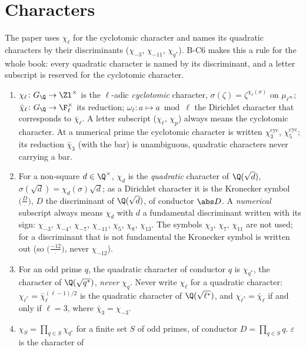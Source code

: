 \section{Characters}\label{sec:notation:characters}

The paper uses $\chi_\ell$ for the cyclotomic character and names its quadratic characters by their discriminants
($\chi_{-3}$, $\chi_{-11}$, $\chi_{q^*}$). B-C6 makes this a rule for the whole book: every quadratic character is named by its
discriminant, and a letter subscript is reserved for the cyclotomic character.

\begin{convention}[B-C6: characters]\label{conv:notation:bc6}
\leavevmode
\begin{enumerate}[label=(\alph*)]
\item $\chi_\ell\colon G_\Q\to\Zl^\times$ is the $\ell$-adic \emph{cyclotomic} character, $\sigma(\zeta)=\zeta^{\chi_\ell(\sigma)}$ on
$\mu_{\ell^\infty}$; $\bar\chi_\ell\colon G_\Q\to\F_\ell^\times$ its reduction; $\omega_\ell\colon a\mapsto a\bmod\ell$ the Dirichlet character that
corresponds to $\bar\chi_\ell$. A letter subscript ($\chi_\ell$, $\chi_p$) always means the cyclotomic character. At a numerical prime the
cyclotomic character is written $\chi_3^{\mathrm{cyc}}$, $\chi_5^{\mathrm{cyc}}$; its reduction $\bar\chi_3$ (with the bar) is unambiguous,
quadratic characters never carrying a bar.
\item For a non-square $d\in\Q^\times$, $\chi_d$ is the \emph{quadratic} character of $\Q(\sqrt d)$, $\sigma(\sqrt d)=\chi_d(\sigma)\sqrt d$; as a
Dirichlet character it is the Kronecker symbol $\bigl(\frac D\cdot\bigr)$, $D$ the discriminant of $\Q(\sqrt d)$, of conductor $\abs D$. A
\emph{numerical} subscript always means $\chi_d$ with $d$ a fundamental discriminant written with its sign: $\chi_{-3}$, $\chi_{-4}$,
$\chi_{-7}$, $\chi_{-11}$, $\chi_5$, $\chi_8$, $\chi_{13}$. The symbols $\chi_3$, $\chi_7$, $\chi_{11}$ are not used; for a discriminant that is
not fundamental the Kronecker symbol is written out (so $\bigl(\frac{-12}\cdot\bigr)$, never $\chi_{-12}$).
\item For an odd prime $q$, the quadratic character of conductor $q$ is $\chi_{q^*}$, the character of $\Q(\sqrt{q^*})$, \emph{never}
$\chi_q$. Never write $\chi_\ell$ for a quadratic character: $\chi_{\ell^*}=\bar\chi_\ell^{(\ell-1)/2}$ is the quadratic character of
$\Q(\sqrt{\ell^*})$, and $\chi_{\ell^*}=\bar\chi_\ell$ if and only if $\ell=3$, where $\bar\chi_3=\chi_{-3}$.
\item $\chi_S=\prod_{q\in S}\chi_{q^*}$ for a finite set $S$ of odd primes, of conductor $D=\prod_{q\in S}q$. $\varepsilon$ is the character of

\end{enumerate}
\end{convention}
